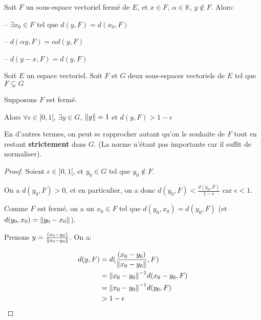

	

\begin{exercice}
	Soit $F$ un sous-espace vectoriel fermé de $E$, et $x \in F$, $\alpha \in
	\mathbb{K}$, $y \notin F$. Alors:

	-- $\exists x_{0} \in F$ tel que $d(y, F) = d(x_{0}, F)$

	-- $d(\alpha y, F) = \alpha d(y, F)$
	
	-- $d(y - x, F) = d(y, F)$
\end{exercice}

\begin{proposition}
	Soit $E$ un espace vectoriel. Soit $F$ et $G$ deux sous-espaces vectoriels
	de $E$ tel que $F \subsetneq G$

	Supposons $F$ est fermé.

	Alors $\forall \epsilon \in ]0, 1[$, $\exists y \in G$, $\norm{y} = 1$ et
	$d(y, F) > 1 - \epsilon$

	En d'autres termes, on peut se rapprocher autant qu'on le souhaite de $F$
	tout en restant \textbf{strictement} dans $G$. (La norme n'étant pas
	importante car il suffit de normaliser).
\end{proposition}

\begin{proof}
	Soient $\epsilon \in ]0, 1[$, et $y_{0} \in G$ tel que $y_{0} \notin F$.
	
	On a $d(y_{0}, F) > 0$, et en particulier, on a donc $d(y_{0}, F) < 
	\frac{d(y_{0},F)}{1 - \epsilon}$ car $\epsilon < 1$.

	Comme $F$ est fermé, on a un $x_{0} \in F$ tel que $d(y_{0}, x_{0}) =
	d(y_{0}, F)$ (et $d(y_{0}, x_{0}) = \norm{y_{0} - x_{0}}$).

	Prenons $y = \frac{(x_{0} - y_{0})}{\norm{x_{0} - y_{0}}}$. On a:

	\begin{align}
		d(y, F) &= d(\frac{(x_{0} - y_{0})}{\norm{x_{0} - y_{0}}}, F) \\
		&= \norm{x_{0} - y_{0}}^{-1} d(x_{0} - y_{0}, F) \\
		&= \norm{x_{0} - y_{0}}^{-1} d(y_{0}, F) \\
		&> 1 - \epsilon
	\end{align}
\end{proof}

